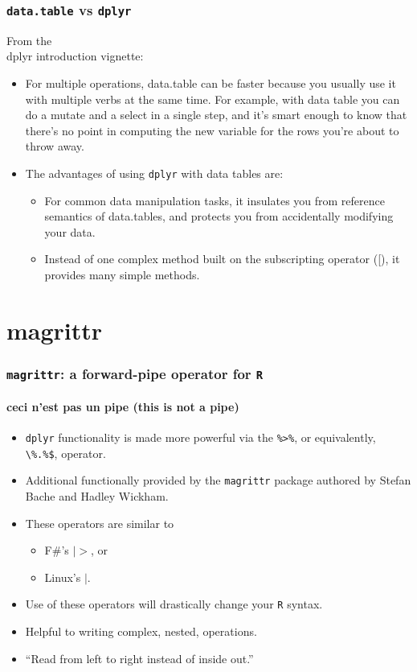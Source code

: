 \documentclass{beamer}\usepackage[]{graphicx}\usepackage[]{color}
\begin{document}
\begin{frame}[fragile]
  \frametitle{{\tt data.table} vs {\tt dplyr}}
  From the {\\ dplyr} introduction vignette:
  \begin{itemize}
    \item For multiple operations, data.table can be faster
      because you usually use it with multiple verbs at the
      same time. For example, with data table you can do a
      mutate and a select in a single step, and it's smart
      enough to know that there's no point in computing the
      new variable for the rows you're about to throw away.
    \item The advantages of using {\tt dplyr} with data
      tables are:
      \begin{itemize}
        \item For common data manipulation tasks, it
          insulates you from reference semantics of
          data.tables, and protects you from accidentally
          modifying your data.
        \item Instead of one complex method built on the
          subscripting operator ([), it provides many simple
          methods.
      \end{itemize} 
  \end{itemize}
\end{frame} 

\section{magrittr}%
\begin{frame}[fragile]
  \frametitle{{\tt magrittr}: a forward-pipe operator for {\tt R}}
  \framesubtitle{ceci n'est pas un pipe (this is not a pipe)}

  \begin{itemize}
    \item {\tt dplyr} functionality is made more powerful via the \verb|%>%|,
      or equivalently, \verb|\%.%$|, operator.

    \item Additional functionally provided by the {\tt magrittr} package
      authored by Stefan Bache and Hadley Wickham.

    \item These operators are similar to 
      \begin{itemize} 
        \item F\#'s $|>$, or
        \item Linux's $|$.
      \end{itemize}

    \item Use of these operators will drastically change your {\tt R} syntax.

    \item Helpful to writing complex, nested, operations.
    \item``Read from left to right instead of inside out.''

  \end{itemize}
\end{frame} 
\end{document}
